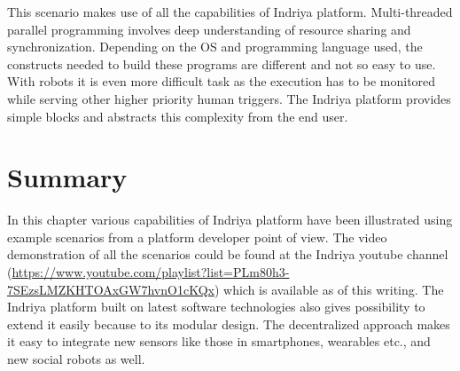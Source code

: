 This scenario makes use of all the capabilities of Indriya platform. Multi-threaded parallel programming involves deep understanding of resource sharing and synchronization. Depending on the OS and programming language used, the constructs needed to build these programs are different and not so easy to use. With robots it is even more difficult task as the execution has to be monitored while serving other higher priority human triggers. The Indriya platform provides simple blocks and abstracts this complexity from the end user.

\section{Summary}
In this chapter various capabilities of Indriya platform have been illustrated using example scenarios from a platform developer point of view. The video demonstration of all the scenarios could be found at the Indriya youtube channel (\url{https://www.youtube.com/playlist?list=PLm80h3-7SEzsLMZKHTOAxGW7hvnO1cKQx}) which is available as of this writing.
The Indriya platform built on latest software technologies also gives possibility to extend it easily because to its modular design. The decentralized approach makes it easy to integrate new sensors like those in smartphones, wearables etc., and new social robots as well. 